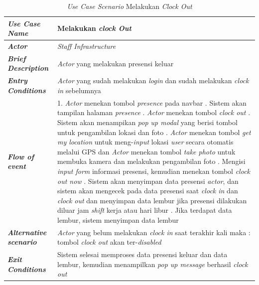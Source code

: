 \FloatBarrier
\begin{longtable}{ |p{6cm}|p{8cm}|}
\caption{\textit{Use Case Scenario} Melakukan \textit{Clock Out}}\label{tab:use-case-scenario-clock-out} 
\\
\hline
\textbf{\textit{Use Case Name}}
&Melakukan \textit{clock Out}
\\ \hline

\textbf{\textit{Actor}}
&\textit{Staff Infrastructure}
\\ \hline

\textbf{\textit{Brief Description}}
&\textit{Actor} yang melakukan presensi keluar
\\ \hline

\textbf{\textit{Entry Conditions}}
&\textit{Actor} yang sudah melakukan \textit{login} dan sudah melakukan \textit{clock in} sebelumnya
\\ \hline

\textbf{\textit{Flow of event}}
&1. \textit{Actor} menekan tombol \textit{presence} pada navbar
\newline
2. Sistem akan tampilan halaman \textit{presence}
\newline
3. \textit{Actor} menekan tombol \textit{clock out}
\newline
4. Sistem akan menampikan \textit{pop up modal} yang berisi tombol untuk pengambilan lokasi dan foto
\newline
5. \textit{Actor} menekan tombol \textit{get my location} untuk meng-\textit{input} lokasi \textit{user} secara otomatis melalui GPS dan \textit{Actor} menekan tombol \textit{take photo} untuk membuka kamera dan melakukan pengambilan foto
\newline
6. Mengisi \textit{input form} informasi presensi, kemudian menekan tombol \textit{clock out now}
\newline
7. Sistem akan menyimpan data presensi \textit{actor}, dan sistem akan mengecek pada data presensi saat \textit{clock in} dan \textit{clock out} dan menyimpan data lembur jika presensi dilakukan diluar jam \textit{shift} kerja atau hari libur
\newline
8. Jika terdapat data lembur, sistem menyimpan data lembur
\\ \hline

\textbf{\textit{Alternative scenario}}
&\textit{Actor} yang belum melakukan \textit{clock in} saat terakhir kali maka : tombol \textit{clock out} akan ter-\textit{disabled}
\\ \hline

\textbf{\textit{Exit Conditions}}
&Sistem selesai memproses data presensi keluar dan data lembur, kemudian menampilkan \textit{pop up message} berhasil \textit{clock out}
\\ \hline
\end{longtable}


